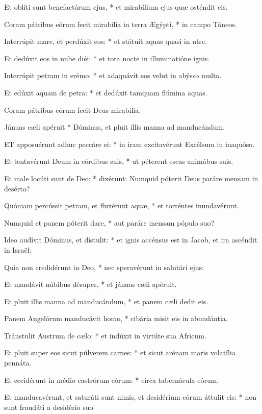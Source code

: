 Et oblíti sunt benefactórum ejus, * et mirabílium ejus quæ osténdit eis.

Coram pátribus eórum fecit mirabília in terra Ægýpti, * in campo Táneos.

Interrúpit mare, et perdúxit eos: * et státuit aquas quasi in utre.

Et dedúxit eos in nube diéi: * et tota nocte in illuminatióne ignis.

Interrúpit petram in erémo: * et adaquávit eos velut in abýsso multa.

Et edúxit aquam de petra: * et dedúxit tamquam flúmina aquas.

 Coram pátribus eórum fecit Deus mirabília.

 Jánuas cæli apéruit * Dóminus, et pluit illis manna ad manducándum.


\lettrine[lines=2]{E}{T} apposuérunt adhuc peccáre ei: * in iram excitavérunt Excélsum in inaquóso.

Et tentavérunt Deum in córdibus suis, * ut péterent escas animábus suis.

Et male locúti sunt de Deo: * dixérunt: Numquid póterit Deus paráre mensam in desérto?

Quóniam percússit petram, et fluxérunt aquæ, * et torréntes inundavérunt.

Numquid et panem póterit dare, * aut paráre mensam pópulo suo?

Ideo audívit Dóminus, et dístulit: * et ignis accénsus est in Jacob, et ira ascéndit in Israël:

Quia non credidérunt in Deo, * nec speravérunt in salutári ejus:

Et mandávit núbibus désuper, * et jánuas cæli apéruit.

Et pluit illis manna ad manducándum, * et panem cæli dedit eis.

Panem Angelórum manducávit homo, * cibária misit eis in abundántia.

Tránstulit Austrum de cælo: * et indúxit in virtúte sua Africum.

Et pluit super eos sicut púlverem carnes: * et sicut arénam maris volatília pennáta.

Et cecidérunt in médio castrórum eórum: * circa tabernácula eórum.

Et manducavérunt, et saturáti sunt nimis, et desidérium eórum áttulit eis: * non sunt fraudáti a desidério suo.

